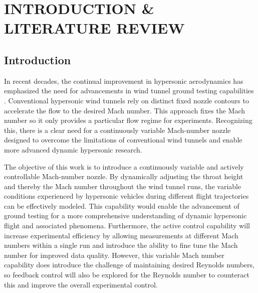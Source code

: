%
%  
%



\pagestyle{plain} %
\setcounter{page}{1}


\chapter{INTRODUCTION \& LITERATURE REVIEW}

\section{Introduction}

In recent decades, the continual improvement in hypersonic aerodynamics has emphasized the need for advancements in wind tunnel ground testing capabilities \cite{leyva}. Conventional hypersonic wind tunnels rely on distinct fixed nozzle contours to accelerate the flow to the desired Mach number. This approach fixes the Mach number so it only provides a particular flow regime for experiments. Recognizing this, there is a clear need for a continuously variable Mach-number nozzle designed to overcome the limitations of conventional wind tunnels and enable more advanced dynamic hypersonic research.

The objective of this work is to introduce a continuously variable and actively controllable Mach-number nozzle. By dynamically adjusting the throat height and thereby the Mach number throughout the wind tunnel runs, the variable conditions experienced by hypersonic vehicles during different flight trajectories can be effectively modeled. This capability would enable the advancement of ground testing for a more comprehensive understanding of dynamic hypersonic flight and associated phenomena. Furthermore, the active control capability will increase experimental efficiency by allowing measurements at different Mach numbers within a single run and introduce the ability to fine tune the Mach number for improved data quality. However, this variable Mach number capability does introduce the challenge of maintaining desired Reynolds numbers, so feedback control will also be explored for the Reynolds number to counteract this and improve the overall experimental control.

